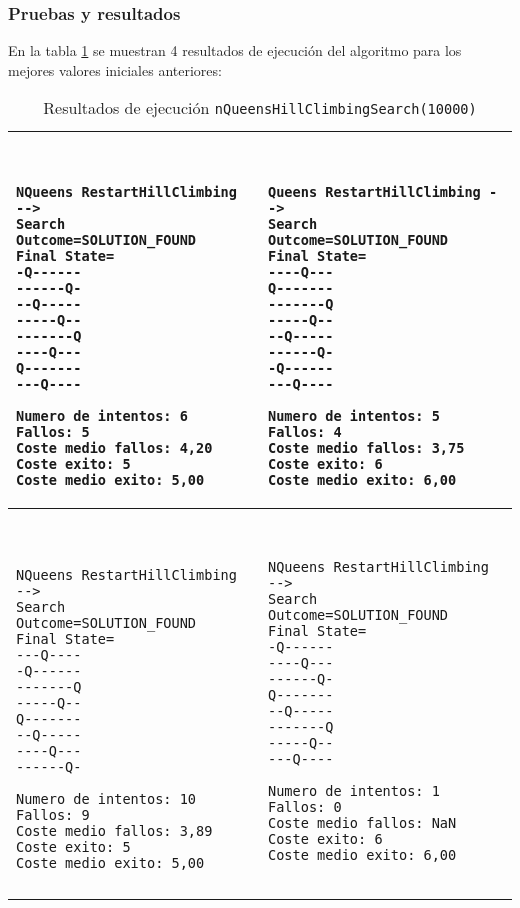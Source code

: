 \documentclass[..main.tex]{subfiles}
\begin{document}
\subsubsection{Pruebas y resultados}
En la tabla \ref{t1-sar} se muestran 4 resultados de ejecución del algoritmo para los mejores valores iniciales anteriores:
\begin{table}[h]
\centering
\begin{tabular}{|l|l|}
\hline
\begin{minipage}{2.5in}
\begin{verbatim}
 
 
NQueens RestartHillClimbing -->
Search Outcome=SOLUTION_FOUND
Final State=
-Q------
------Q-
--Q-----
-----Q--
-------Q
----Q---
Q-------
---Q----

Numero de intentos: 6
Fallos: 5
Coste medio fallos: 4,20
Coste exito: 5
Coste medio exito: 5,00
 \end{verbatim}
 \end{minipage}
&
\begin{minipage}{2.5in}
 \begin{verbatim}


Queens RestartHillClimbing -->
Search Outcome=SOLUTION_FOUND
Final State=
----Q---
Q-------
-------Q
-----Q--
--Q-----
------Q-
-Q------
---Q----

Numero de intentos: 5
Fallos: 4
Coste medio fallos: 3,75
Coste exito: 6
Coste medio exito: 6,00
 \end{verbatim}
 \end{minipage}
 \\
\hline
\begin{minipage}{2.5in}
 \begin{verbatim}
 
 
NQueens RestartHillClimbing -->
Search Outcome=SOLUTION_FOUND
Final State=
---Q----
-Q------
-------Q
-----Q--
Q-------
--Q-----
----Q---
------Q-

Numero de intentos: 10
Fallos: 9
Coste medio fallos: 3,89
Coste exito: 5
Coste medio exito: 5,00

\end{verbatim}
\end{minipage}
 &
 \begin{minipage}{2.5in}
  \begin{verbatim}
  
  
NQueens RestartHillClimbing -->
Search Outcome=SOLUTION_FOUND
Final State=
-Q------
----Q---
------Q-
Q-------
--Q-----
-------Q
-----Q--
---Q----

Numero de intentos: 1
Fallos: 0
Coste medio fallos: NaN
Coste exito: 6
Coste medio exito: 6,00


\end{verbatim}
\end{minipage}
\\
\hline
 \end{tabular}
      \caption{\label{t1-sar} Resultados de ejecución \texttt{nQueensHillClimbingSearch(10000)}}
\end{table}
\end{document}
